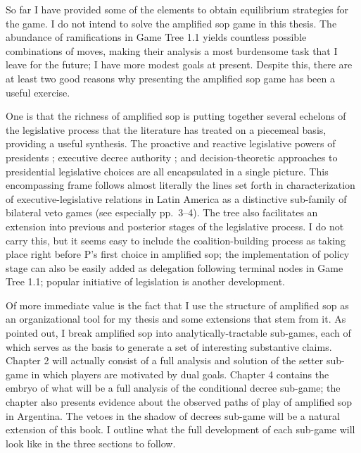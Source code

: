 So far I have provided some of the elements to obtain equilibrium strategies for the game.  I do not intend to solve the amplified sop game in this thesis.  The abundance of ramifications in Game Tree 1.1 yields countless possible combinations of moves, making their analysis a most burdensome task that I leave for the future; I have more modest goals at present.  Despite this, there are at least two good reasons why presenting the amplified sop game has been a useful exercise.  

One is that the richness of amplified sop is putting together several echelons of the legislative process that the literature has treated on a piecemeal basis, providing a useful synthesis.  The proactive and reactive legislative powers of presidents \citep{mainwaring.shugart.1997a}; executive decree authority \citep{carey.shugart.1998,remington.etal.1998}; and decision-theoretic approaches to presidential legislative choices \citep[eg.][]{amorim.1998} are all encapsulated in a single picture.  This encompassing frame follows almost literally the lines set forth in \citet{cox.morgenstern.1998} characterization of executive-legislative relations in Latin America as a distinctive sub-family of bilateral veto games (see especially pp.\ 3--4).  The tree also facilitates an extension into previous and posterior stages of the legislative process.  I do not carry this, but it seems easy to include the coalition-building process \citep{amorim.1998,deheza.1997} as taking place right before P’s first choice in amplified sop; the implementation of policy stage \citep{denhartog.2000,rosenblum.2000} can also be easily added as delegation following terminal nodes in Game Tree 1.1; popular initiative of legislation \citep{gerber.1996} is another development.  

Of more immediate value is the fact that I use the structure of amplified sop as an organizational tool for my thesis and some extensions that stem from it.  As pointed out, I break amplified sop into analytically-tractable sub-games, each of which serves as the basis to generate a set of interesting substantive claims.  Chapter 2 will actually consist of a full analysis and solution of the setter sub-game in which players are motivated by dual goals.  Chapter 4 contains the embryo of what will be a full analysis of the conditional decree sub-game; the chapter also presents evidence about the observed paths of play of amplified sop in Argentina.  The vetoes in the shadow of decrees sub-game will be a natural extension of this book.  I outline what the full development of each sub-game will look like in the three sections to follow.  

